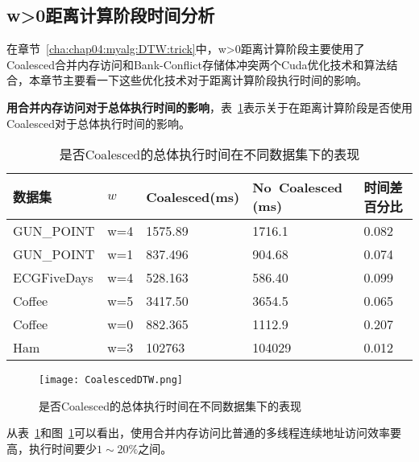 \subsection{w>0距离计算阶段时间分析}

在章节~\ref{cha:chap04:myalg:DTW:trick}中，w>0距离计算阶段主要使用了Coalesced合并内存访问和Bank-Conflict存储体冲突两个Cuda优化技术和算法结合，本章节主要看一下这些优化技术对于距离计算阶段执行时间的影响。%

\textbf{用合并内存访问对于总体执行时间的影响}，表~\ref{tab:TimeCoalesced}表示关于在距离计算阶段是否使用Coalesced对于总体执行时间的影响。%

\begin{table}[htbp]
	\centering
	\begin{minipage}{0.85\textwidth}
		\caption{是否Coalesced的总体执行时间在不同数据集下的表现}
		\label{tab:TimeCoalesced}
		\begin{tabular}{p{3cm}p{1cm}p{2cm}p{2.5cm}p{2cm}}
			\toprule[1.5pt]
			{\heiti 数据集 }& {\heiti $w$ } &{\heiti Coalesced(ms) } &{\heiti No~Coalesced (ms) } &{\heiti 时间差 百分比 }
			\\\midrule[1pt]			
				GUN\_POINT & w=4 & 1575.89 & 1716.1 & 0.082\\
				GUN\_POINT & w=1 & 837.496 & 904.68 & 0.074\\
				ECGFiveDays & w=4 & 528.163 & 586.40 & 0.099\\
				Coffee & w=5 & 3417.50 & 3654.5 & 0.065\\
				Coffee & w=0 & 882.365 & 1112.9 & 0.207\\
				Ham & w=3 & 102763 & 104029 & 0.012\\
			\bottomrule[1.5pt]
		\end{tabular}
	\end{minipage}
\end{table}

\begin{figure}[H] %
	\centering
	\texttt{[image: CoalescedDTW.png]}
	\caption{是否Coalesced的总体执行时间在不同数据集下的表现}
	\label{fig:CoalescedDTW}
\end{figure}

从表~\ref{tab:TimeCoalesced}和图~\ref{fig:CoalescedDTW}可以看出，使用合并内存访问比普通的多线程连续地址访问效率要高，执行时间要少$1\sim 20\%$之间。%

